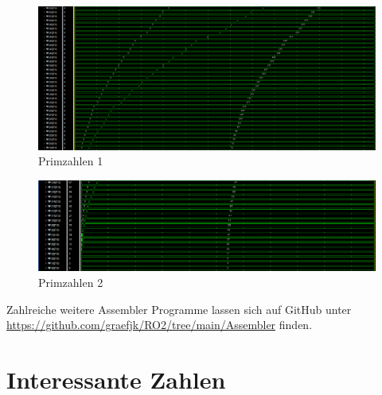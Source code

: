 \documentclass[bibliography=totoc,listof=totoc,index=totoc]{scrartcl}
\begin{document}
\begin{figure}[H]
    \centering
    \includegraphics[width=\textwidth]{Primes1.png}
    \caption{Primzahlen 1}
    \label{fig:Primes1}
\end{figure}
\begin{figure}[H]
    \centering
    \includegraphics[width=\textwidth]{Primes2.png}
    \caption{Primzahlen 2}
    \label{fig:Primes2}
\end{figure}


Zahlreiche weitere Assembler Programme lassen sich auf GitHub unter\\
\url{https://github.com/graefjk/RO2/tree/main/Assembler} finden.

\section{Interessante Zahlen}\label{sec:Interesante Zahlen}
    
\end{document}
